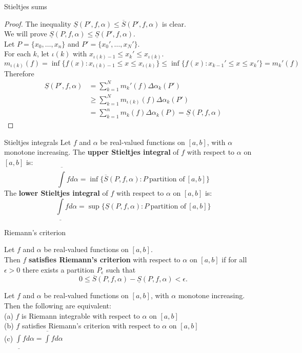 \documentclass{beamer}
\begin{document}
\begin{frame}{Stieltjes sums}
\begin{proof}
The inequality $\underline{S}(P',f,\alpha) \leq \overline{S}(P',f,\alpha)$ is clear.\\
\pause
We will prove $\underline{S}(P,f,\alpha) \leq \underline{S}(P',f,\alpha)$.\\
\pause
Let $P=\{x_0,\dots, x_n\}$ and $P'=\{x_0',\dots, x_N'\}$.\\
\pause
For each $k$, let $\iota(k)$ with $x_{\iota(k)-1} \leq x_k'\leq x_{\iota(k)}$.\\
\pause
{
\tiny
$$m_{\iota(k)}(f)=\inf\{f(x): x_{\iota(k)-1}\leq x\leq x_{\iota(k)}\}\leq \inf\{f(x): x_{k-1}'\leq x\leq x_k'\}=m_k'(f)$$
}
\pause
Therefore 
{\tiny
\begin{align*}
\underline{S}(P',f,\alpha)
 &=    \sum_{k=1}^N m_k'(f)\Delta\alpha_k(P')\\
 &\geq \sum_{k=1}^N m_{\iota(k)}(f)\Delta\alpha_k(P')\\
 & = \sum_{k=1}^n m_{k}(f)\Delta\alpha_k(P) = \underline{S}(P,f,\alpha)
\end{align*}
}
\end{proof}
\end{frame}

\begin{frame}{Stieltjes integrals}
Let $f$ and $\alpha$ be real-valued functions on $[a,b]$, with $\alpha$ monotone increasing.
\pause
The \textbf{upper Stieltjes integral} of $f$ with respect to $\alpha$ on $[a,b]$ is:
$$\overline{\int} fd\alpha = \inf\{\overline{S}(P,f,\alpha): P\ \text{partition of}\ [a,b]\}$$
\pause
The \textbf{lower Stieltjes integral} of $f$ with respect to $\alpha$ on $[a,b]$ is:
$$\underline{\int} fd\alpha = \sup\{\underline{S}(P,f,\alpha): P\ \text{partition of}\ [a,b]\}$$
\end{frame}

\begin{frame}{Riemann's criterion}
\begin{defn}
Let $f$ and $\alpha$ be real-valued functions on $[a,b]$.\\
Then $f$ \textbf{satisfies Riemann's criterion} with respect to $\alpha$ on $[a,b]$ if for all $\epsilon > 0$ there exists a partition $P_\epsilon$ such that
$$0\leq \overline S(P,f,\alpha)-\underline S(P,f,\alpha) < \epsilon.$$
\end{defn}
\pause
\begin{thm}
Let $f$ and $\alpha$ be real-valued functions on $[a,b]$, with $\alpha$ monotone increasing.  Then the following are equivalent:\\
\pause
(a) $f$ is Riemann integrable with respect to $\alpha$ on $[a,b]$\\
\pause
(b) $f$ satisfies Riemann's criterion with respect to $\alpha$ on $[a,b]$\\
\pause
(c) $\underline \int f d\alpha = \overline \int f d\alpha$
\end{thm}
\end{frame}
\end{document}
